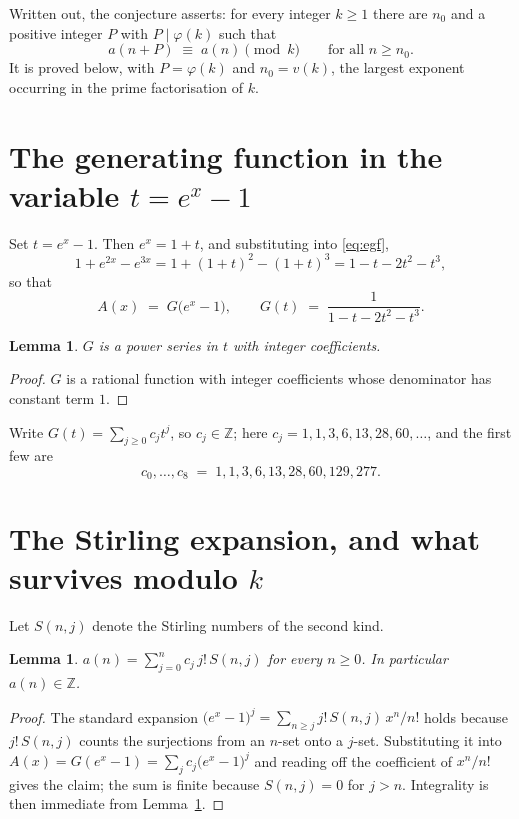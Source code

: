 \documentclass[11pt,a4paper]{article}
\theoremstyle{plain}
\newtheorem{lemma}[theorem]{Lemma}
\theoremstyle{definition}
\begin{document}
Written out, the conjecture asserts: for every integer $k\ge 1$ there are $n_0$ and a
positive integer $P$ with $P\mid\varphi(k)$ such that
\begin{equation}\label{eq:conj}
a(n+P)\;\equiv\;a(n)\pmod{k}\qquad\text{for all } n\ge n_0 .
\end{equation}
It is proved below, with $P=\varphi(k)$ and $n_0=v(k)$, the largest exponent occurring in
the prime factorisation of $k$.

\section{The generating function in the variable $t=e^{x}-1$}

Set $t=e^{x}-1$. Then $e^{x}=1+t$, and substituting into \eqref{eq:egf},
\[
1+e^{2x}-e^{3x}=1+(1+t)^{2}-(1+t)^{3}=1-t-2t^{2}-t^{3},
\]
so that
\begin{equation}\label{eq:G}
A(x)\;=\;G\bigl(e^{x}-1\bigr),\qquad
G(t)\;=\;\frac{1}{1-t-2t^{2}-t^{3}}.
\end{equation}

\begin{lemma}\label{lem:int}
$G$ is a power series in $t$ with integer coefficients.
\end{lemma}

\begin{proof}
$G$ is a rational function with integer coefficients whose denominator has constant term $1$.
\end{proof}

Write $G(t)=\sum_{j\ge0}c_j t^{j}$, so $c_j\in\mathbb{Z}$; here $c_j = 1, 1, 3, 6, 13, 28, 60, \dots$, and the
first few are
\[
c_0,\dots,c_8 \;=\; 1, 1, 3, 6, 13, 28, 60, 129, 277.
\]

\section{The Stirling expansion, and what survives modulo $k$}

Let $S(n,j)$ denote the Stirling numbers of the second kind.

\begin{lemma}\label{lem:stir}
$a(n)=\sum_{j=0}^{n} c_j\, j!\, S(n,j)$ for every $n\ge 0$. In particular $a(n)\in\mathbb{Z}$.
\end{lemma}

\begin{proof}
The standard expansion $\bigl(e^{x}-1\bigr)^{j}
=\sum_{n\ge j} j!\,S(n,j)\,x^{n}/n!$ holds because $j!\,S(n,j)$ counts the surjections
from an $n$-set onto a $j$-set. Substituting it into
$A(x)=G(e^{x}-1)=\sum_j c_j\bigl(e^{x}-1\bigr)^{j}$ and reading off the coefficient of
$x^{n}/n!$ gives the claim; the sum is finite because $S(n,j)=0$ for $j>n$. Integrality is
then immediate from Lemma~\ref{lem:int}.
\end{proof}
\end{document}
